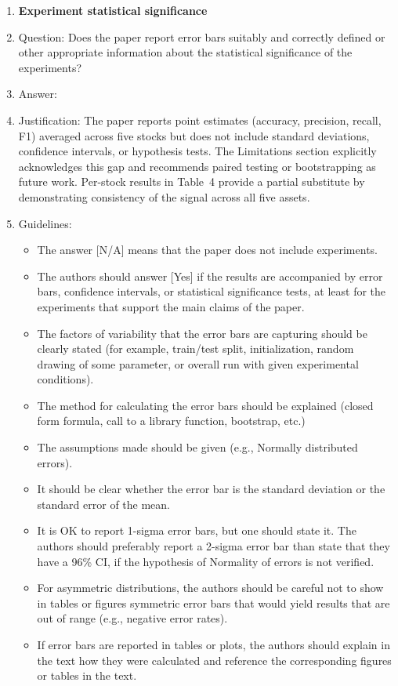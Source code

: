 \documentclass{article}
\begin{document}
\begin{enumerate}
\item {\bf Experiment statistical significance}
    \item[] Question: Does the paper report error bars suitably and correctly defined or other appropriate
information about the statistical significance of the experiments?
    \item[] Answer: \answerNo{}
    \item[] Justification: The paper reports point estimates (accuracy, precision, recall, F1)
    averaged across five stocks but does not include standard deviations, confidence intervals,
    or hypothesis tests. The Limitations section explicitly acknowledges this gap and recommends
    paired testing or bootstrapping as future work. Per-stock results in Table~4 provide a partial
    substitute by demonstrating consistency of the signal across all five assets.
    \item[] Guidelines:
    \begin{itemize}
        \item The answer [N/A] means that the paper does not include experiments.
        \item The authors should answer [Yes] if the results are accompanied by error bars, confidence
intervals, or statistical significance tests, at least for the experiments that support the
main claims of the paper.
        \item The factors of variability that the error bars are capturing should be clearly stated (for
example, train/test split, initialization, random drawing of some parameter, or overall
run with given experimental conditions).
        \item The method for calculating the error bars should be explained (closed form formula,
call to a library function, bootstrap, etc.)
        \item The assumptions made should be given (e.g., Normally distributed errors).
        \item It should be clear whether the error bar is the standard deviation or the standard error
of the mean.
        \item It is OK to report 1-sigma error bars, but one should state it. The authors should
preferably report a 2-sigma error bar than state that they have a 96\% CI, if the hypothesis
of Normality of errors is not verified.
        \item For asymmetric distributions, the authors should be careful not to show in tables or
figures symmetric error bars that would yield results that are out of range (e.g., negative
error rates).
        \item If error bars are reported in tables or plots, the authors should explain in the text how
they were calculated and reference the corresponding figures or tables in the text.
    \end{itemize}


\end{enumerate}
\end{document}
